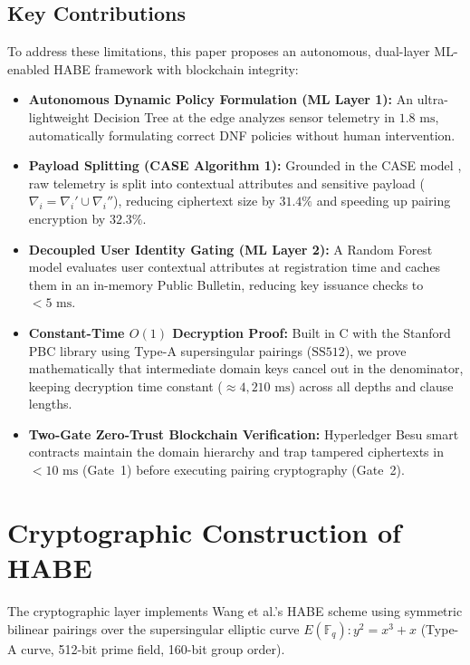 \documentclass[conference]{IEEEtran}
\begin{document}
\subsection{Key Contributions}
To address these limitations, this paper proposes an autonomous, dual-layer ML-enabled HABE framework with blockchain integrity:
\begin{itemize}
    \item \textbf{Autonomous Dynamic Policy Formulation (ML Layer 1):} An ultra-lightweight Decision Tree at the edge analyzes sensor telemetry in $1.8\text{ ms}$, automatically formulating correct DNF policies without human intervention.
    \item \textbf{Payload Splitting (CASE Algorithm 1):} Grounded in the CASE model \cite{ghosh2022case}, raw telemetry is split into contextual attributes and sensitive payload ($\nabla_i = \nabla_i' \cup \nabla_i''$), reducing ciphertext size by $31.4\%$ and speeding up pairing encryption by $32.3\%$.
    \item \textbf{Decoupled User Identity Gating (ML Layer 2):} A Random Forest model evaluates user contextual attributes at registration time and caches them in an in-memory Public Bulletin, reducing key issuance checks to $<5\text{ ms}$.
    \item \textbf{Constant-Time $O(1)$ Decryption Proof:} Built in C with the Stanford PBC library \cite{freeman2026pbc} using Type-A supersingular pairings ($\text{SS512}$), we prove mathematically that intermediate domain keys cancel out in the denominator, keeping decryption time constant ($\approx 4,210\text{ ms}$) across all depths and clause lengths.
    \item \textbf{Two-Gate Zero-Trust Blockchain Verification:} Hyperledger Besu smart contracts maintain the domain hierarchy and trap tampered ciphertexts in $<10\text{ ms}$ (Gate~1) before executing pairing cryptography (Gate~2).
\end{itemize}

\section{Cryptographic Construction of HABE}
The cryptographic layer implements Wang et al.'s HABE scheme \cite{wang2011habe} using symmetric bilinear pairings over the supersingular elliptic curve $E(\mathbb{F}_q): y^2 = x^3 + x$ (Type-A curve, 512-bit prime field, 160-bit group order).
\end{document}
